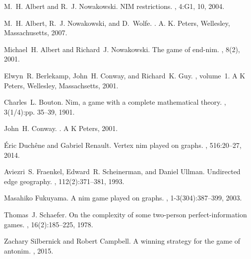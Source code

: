 \documentclass[letter,10pt]{article}
\begin{document}

\begin{thebibliography}{10}

M.~H. Albert and R.~J. Nowakowski.
\newblock N{IM} restrictions.
, 4:G1, 10, 2004.

M.~H. Albert, R.~J. Nowakowski, and D.~Wolfe.
.
\newblock A. K. Peters, Wellesley, Massachusetts, 2007.

Michael~H. Albert and Richard~J. Nowakowski.
\newblock The game of end-nim.
, 8(2), 2001.

Elwyn~R. Berlekamp, John~H. Conway, and Richard~K. Guy.
, volume~1.
\newblock A K Peters, Wellesley, Massachsetts, 2001.

Charles~L. Bouton.
\newblock Nim, a game with a complete mathematical theory.
, 3(1/4):pp. 35--39, 1901.

John~H. Conway.
.
\newblock A {K} Peters, 2001.

{\'{E}}ric Duch{\^{e}}ne and Gabriel Renault.
\newblock Vertex nim played on graphs.
, 516:20--27, 2014.

Aviezri~S. Fraenkel, Edward~R. Scheinerman, and Daniel Ullman.
\newblock Undirected edge geography.
, 112(2):371--381, 1993.

Masahiko Fukuyama.
\newblock A nim game played on graphs.
, 1-3(304):387--399, 2003.

Thomas~J. Schaefer.
\newblock On the complexity of some two-person perfect-information games.
, 16(2):185--225, 1978.

Zachary Silbernick and Robert Campbell.
\newblock A winning strategy for the game of antonim.
, 2015.

\end{thebibliography}
\end{document}
